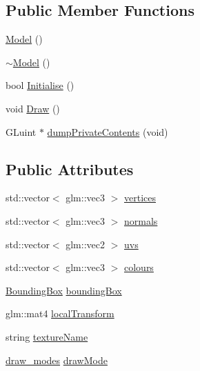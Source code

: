 \subsection*{Public Member Functions}
\begin{DoxyCompactItemize}
\item 
\hyperlink{class_b_g_e_1_1_model_ae3b375de5f6df4faf74a95d64748e048}{Model} ()
\item 
\hyperlink{class_b_g_e_1_1_model_ad6ebd2062a0b823db841a0b88baac4c0}{$\sim$\-Model} ()
\item 
bool \hyperlink{class_b_g_e_1_1_model_abaa883a7def8ea1957a211bbf7b4f399}{Initialise} ()
\item 
void \hyperlink{class_b_g_e_1_1_model_a0c668c13fc79a86326f75ea231f3886f}{Draw} ()
\item 
G\-Luint $\ast$ \hyperlink{class_b_g_e_1_1_model_aec27837693fa25f621a79d9534e23536}{dump\-Private\-Contents} (void)
\end{DoxyCompactItemize}
\subsection*{Public Attributes}
\begin{DoxyCompactItemize}
\item 
std\-::vector$<$ glm\-::vec3 $>$ \hyperlink{class_b_g_e_1_1_model_a4cea848aab716e40b9bde28cd922720d}{vertices}
\item 
std\-::vector$<$ glm\-::vec3 $>$ \hyperlink{class_b_g_e_1_1_model_ac2e15ec05b6327a4a93c87d487e51c60}{normals}
\item 
std\-::vector$<$ glm\-::vec2 $>$ \hyperlink{class_b_g_e_1_1_model_ab87b9ba4866781f4db316507f0391e00}{uvs}
\item 
std\-::vector$<$ glm\-::vec3 $>$ \hyperlink{class_b_g_e_1_1_model_a823f2c370081fbc2438da2de700271fd}{colours}
\item 
\hyperlink{struct_b_g_e_1_1_bounding_box}{Bounding\-Box} \hyperlink{class_b_g_e_1_1_model_a44723a79125d28e2cec5d70d4a4363d1}{bounding\-Box}
\item 
glm\-::mat4 \hyperlink{class_b_g_e_1_1_model_acfafbb8464feb0aa8695c9ec53407601}{local\-Transform}
\item 
string \hyperlink{class_b_g_e_1_1_model_acaed7dd09ab85e191e342d96e54793e9}{texture\-Name}
\item 
\hyperlink{class_b_g_e_1_1_model_a0d55ea97da6ffbc3b82c2c1566d13a5e}{draw\-\_\-modes} \hyperlink{class_b_g_e_1_1_model_a7ff9d0fadd85be1fcbd0cd254c3e23ee}{draw\-Mode}
\end{DoxyCompactItemize}


